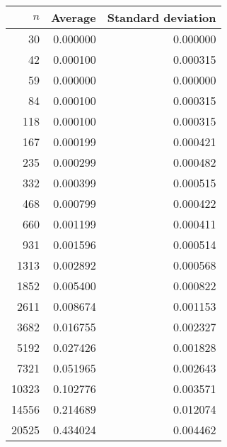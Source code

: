 \begin {tabular}{rrr}
$n$ & Average & Standard deviation\\ \hline 
30 & 0.000000 & 0.000000\\ 
42 & 0.000100 & 0.000315\\ 
59 & 0.000000 & 0.000000\\ 
84 & 0.000100 & 0.000315\\ 
118 & 0.000100 & 0.000315\\ 
167 & 0.000199 & 0.000421\\ 
235 & 0.000299 & 0.000482\\ 
332 & 0.000399 & 0.000515\\ 
468 & 0.000799 & 0.000422\\ 
660 & 0.001199 & 0.000411\\ 
931 & 0.001596 & 0.000514\\ 
1313 & 0.002892 & 0.000568\\ 
1852 & 0.005400 & 0.000822\\ 
2611 & 0.008674 & 0.001153\\ 
3682 & 0.016755 & 0.002327\\ 
5192 & 0.027426 & 0.001828\\ 
7321 & 0.051965 & 0.002643\\ 
10323 & 0.102776 & 0.003571\\ 
14556 & 0.214689 & 0.012074\\ 
20525 & 0.434024 & 0.004462\\ 
\end{tabular}
